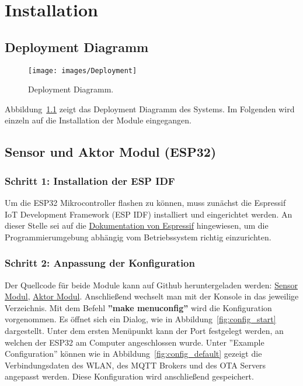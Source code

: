 \chapter{Installation}
\label{cha:Installation}

\section{Deployment Diagramm}

\begin{figure}[hbt]
	\centering
	\texttt{[image: images/Deployment]}
	\caption[Deployment Diagramm]{Deployment Diagramm.}
	\label{fig:deployment_diagramm}
\end{figure}

Abbildung~\ref{fig:deployment_diagramm} zeigt das Deployment Diagramm des Systems. Im Folgenden wird einzeln auf die Installation der Module eingegangen.

\section{Sensor und Aktor Modul (ESP32)}
\label{cha:Installation_IDF}
\subsection{Schritt 1: Installation der ESP IDF}
Um die ESP32 Mikrocontroller flashen zu können, muss zunächst die Espressif IoT Development Framework (ESP IDF) installiert und eingerichtet werden. An dieser Stelle sei auf die \href{https://docs.espressif.com/projects/esp-idf/en/latest/index.html}{Dokumentation von Espressif} hingewiesen, um die Programmierumgebung abhängig vom Betriebssystem richtig einzurichten.

\subsection{Schritt 2: Anpassung der Konfiguration}
Der Quellcode für beide Module kann auf Github heruntergeladen werden: \href{https://github.com/maxbachmann-university/esp32-sensor-modul}{Sensor Modul}, \href{https://github.com/maxbachmann-university/esp32-actuator-module}{Aktor Modul}.
Anschließend wechselt man mit der Konsole in das jeweilige Verzeichnis. Mit dem Befehl \textbf{''make menuconfig''} wird die Konfiguration vorgenommen. Es öffnet sich ein Dialog, wie in Abbildung~\ref{fig:config_start} dargestellt. Unter dem ersten Menüpunkt kann der Port festgelegt werden, an welchen der ESP32 am Computer angeschlossen wurde. Unter ''Example Configuration'' können wie in Abbildung~\ref{fig:config_default} gezeigt die Verbindungsdaten des WLAN, des MQTT Brokers und des OTA Servers angepasst werden. Diese Konfiguration wird anschließend gespeichert.


